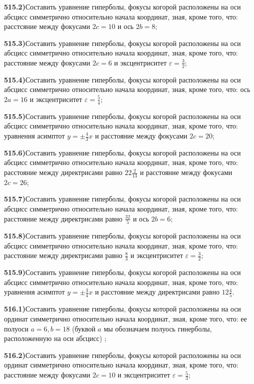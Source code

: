 \textbf{515.2)}Составить уравнение гиперболы, фокусы когорой расположены на оси абсцисс симметрично относительно начала координат, зная, кроме того, что: расстсяние между фокусами $2 c=10$ и ось $2 b=8$;

\textbf{515.3)}Составить уравнение гиперболы, фокусы когорой расположены на оси абсцисс симметрично относительно начала координат, зная, кроме того, что: расстояние между фокусами $2 c=6$ и эксцентриситет $\varepsilon=\frac{3}{2}$;

\textbf{515.4)}Составить уравнение гиперболы, фокусы когорой расположены на оси абсцисс симметрично относительно начала координат, зная, кроме того, что: ось $2 a=16$ и эксцентриситет $\varepsilon=\frac{5}{4}$;

\textbf{515.5)}Составить уравнение гиперболы, фокусы когорой расположены на оси абсцисс симметрично относительно начала координат, зная, кроме того, что: уравнения асимптот $y= \pm \frac{4}{3} x$ и расстояние между фокусами $2 c=20$;

\textbf{515.6)}Составить уравнение гиперболы, фокусы когорой расположены на оси абсцисс симметрично относительно начала координат, зная, кроме того, что: расстояние между директрисами равно $22 \frac{2}{13}$ и расстояние между фокусами $2 c=26$;

\textbf{515.7)}Составить уравнение гиперболы, фокусы когорой расположены на оси абсцисс симметрично относительно начала координат, зная, кроме того, что: расстояние между директрисами равно $\frac{32}{5}$ и ось $2 b=6$;

\textbf{515.8)}Составить уравнение гиперболы, фокусы когорой расположены на оси абсцисс симметрично относительно начала координат, зная, кроме того, что: расстояние между директрисами равно $\frac{8}{3}$ и эксцентриситет $\varepsilon=\frac{3}{2}$;

\textbf{515.9)}Составить уравнение гиперболы, фокусы когорой расположены на оси абсцисс симметрично относительно начала координат, зная, кроме того, что: уравнения асимптот $y= \pm \frac{3}{4} x$ и расстояние между директрисами равно $12 \frac{4}{5}$.

\textbf{516.1)}Составить уравнение гиперболы, фокусы которой расположены на оси ординат симметрично относительно начала координат, зная, кроме того, что: ее полуоси $a=6, b=18$ (буквой $a$ мы обозначаем полуось гинерболы, расположенную на оси абсцисс) ;

\textbf{516.2)}Составить уравнение гиперболы, фокусы которой расположены на оси ординат симметрично относительно начала координат, зная, кроме того, что: расстояние между фокусами $2 c=10$ и эксцентриситет $\varepsilon=\frac{5}{3}$;

